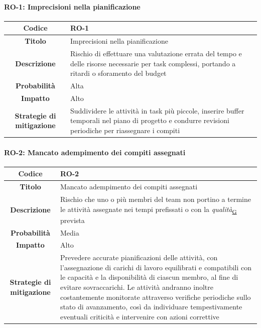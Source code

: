 \documentclass[a4paper,12pt]{article}
\begin{document}
{{            \paragraph{RO-1: Imprecisioni nella pianificazione}\mbox{}{     
                \begin{longtable}{|c|p{11cm}|}
                    \hline
                    \textbf{Codice} & RO-1 \\
                    \hline
                    \textbf{Titolo} & Imprecisioni nella pianificazione\\
                    \hline
                    \textbf{Descrizione} & Rischio di effettuare una valutazione errata del tempo e delle risorse necessarie per task complessi, portando a ritardi o sforamento del budget \\
                    \hline
                    \textbf{Probabilità} & Alta \\
                    \hline
                    \textbf{Impatto} & Alto \\
                    \hline
                    \textbf{Strategie di mitigazione} & Suddividere le attività in task più piccole, inserire buffer temporali nel piano di progetto e condurre revisioni periodiche per riassegnare i compiti \\
                    \hline
                \end{longtable}
            }
                
            \paragraph{RO-2: Mancato adempimento dei compiti assegnati}\mbox{}{     
                \begin{longtable}{|c|p{11cm}|}
                    \hline
                    \textbf{Codice} & RO-2 \\
                    \hline
                    \textbf{Titolo} & Mancato adempimento dei compiti assegnati \\
                    \hline
                    \textbf{Descrizione} & Rischio che uno o più membri del team non portino a termine le attività assegnate nei tempi prefissati o con la \textit{qualità}\textsubscript{\href{https://atlasteam9.github.io/Atlas/glossario.html\#Qualità}{G}} prevista \\
                    \hline
                    \textbf{Probabilità} & Media \\
                    \hline
                    \textbf{Impatto} & Alto \\
                    \hline
                    \textbf{Strategie di mitigazione} & Prevedere accurate pianificazioni delle attività, con l'assegnazione di carichi di lavoro equilibrati e compatibili con le capacità e la disponibilità di ciascun membro, al fine di evitare sovraccarichi. Le attività andranno inoltre costantemente monitorate attraverso verifiche periodiche sullo stato di avanzamento, così da individuare tempestivamente eventuali criticità e intervenire con azioni correttive \\
                    \hline
                \end{longtable}
            }

}}
\end{document}
